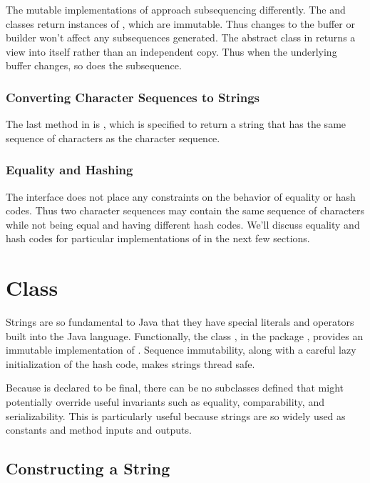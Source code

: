 The mutable implementations of  approach
subsequencing differently.  The  and
 classes return instances of , which
are immutable.  Thus changes to the buffer or builder won't affect any
subsequences generated.  The  abstract class in
 returns a view into itself rather than an independent
copy.  Thus when the underlying buffer changes, so does the
subsequence.

\subsubsection{Converting Character Sequences to Strings}

The last method in  is , which is
specified to return a string that has the same sequence of characters
as the character sequence.  

\subsubsection{Equality and Hashing}

The  interface does not place any constraints on
the behavior of equality or hash codes.  Thus two character sequences
may contain the same sequence of characters while not being equal
and having different hash codes.  We'll discuss equality and hash
codes for particular implementations of  in the
next few sections.


\section{ Class}

Strings are so fundamental to Java that they have special literals and
operators built into the Java language.  Functionally, the class
, in the package , provides an immutable
implementation of .  Sequence immutability, along
with a careful lazy initialization of the hash code, makes strings
thread safe.

Because  is declared to be final, there can be no
subclasses defined that might potentially override useful invariants
such as equality, comparability, and serializability.  This is
particularly useful because strings are so widely used as constants
and method inputs and outputs.

\subsection{Constructing a String}

